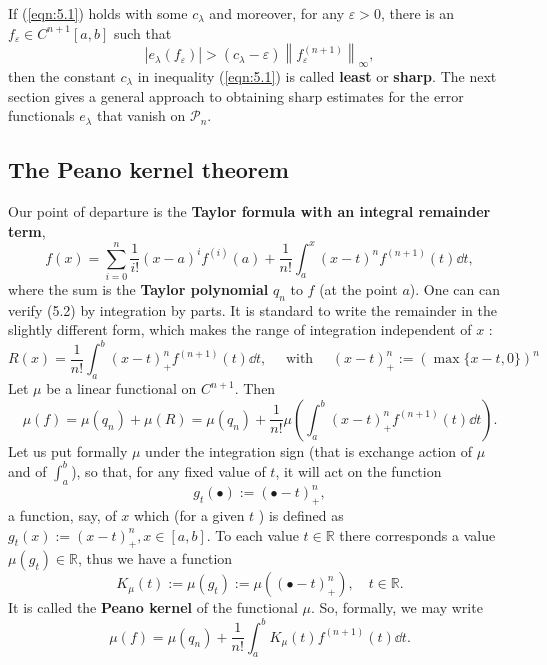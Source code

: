 \documentclass[a4paper]{article}
\renewcommand{\epsilon}{\varepsilon}
\begin{document}
If (\ref{eqn:5.1}) holds with some $c_\lambda$ and moreover, for any $\epsilon>0$, there is an $f_\epsilon \in C^{n+1}[a, b]$ such that
\[
\left|e_\lambda\left(f_\epsilon\right)\right|>\left(c_\lambda-\epsilon\right)\left\|f_\epsilon^{(n+1)}\right\|_{\infty},
\]
then the constant $c_\lambda$ in inequality (\ref{eqn:5.1}) is called \textbf{least} or \textbf{sharp}. The next section gives a general approach to obtaining sharp estimates for the error functionals $e_\lambda$ that vanish on $\mathcal{P}_n$.

\subsection{The Peano kernel theorem}

Our point of departure is the \textbf{Taylor formula with an integral remainder term},
\begin{equation}\label{eqn:5.2}
    f(x)=\sum_{i=0}^n \frac{1}{i !}(x-a)^i f^{(i)}(a)+\frac{1}{n !} \int_a^x(x-t)^n f^{(n+1)}(t)\dd{t},
\end{equation}
where the sum is the \textbf{Taylor polynomial} $q_n$ to $f$ (at the point $a$). One can can verify (5.2) by integration by parts. It is standard to write the remainder in the slightly different form, which makes the range of integration independent of $x$ :
\[
R(x)=\frac{1}{n !} \int_a^b(x-t)_{+}^n f^{(n+1)}(t)\dd{t}, \quad \text { with } \quad(x-t)_{+}^n:=(\max \{x-t, 0\})^n
\]
Let $\mu$ be a linear functional on $C^{n+1}$. Then
\[
\mu(f)=\mu\left(q_n\right)+\mu(R)=\mu\left(q_n\right)+\frac{1}{n !} \mu\left(\int_a^b(x-t)_{+}^n f^{(n+1)}(t)\dd{t}\right) .
\]
Let us put formally $\mu$ under the integration sign (that is exchange action of $\mu$ and of $\int_a^b$), so that, for any fixed value of $t$, it will act on the function
\[
g_t(\bullet):=(\bullet-t)_{+}^n,
\]
a function, say, of $x$ which (for a given $t$ ) is defined as $g_t(x):=(x-t)_{+}^n, x \in[a, b]$. To each value $t \in \mathbb{R}$ there corresponds a value $\mu\left(g_t\right) \in \mathbb{R}$, thus we have a function
\[
K_\mu(t):=\mu\left(g_t\right):=\mu\left((\bullet-t)_{+}^n\right), \quad t \in \mathbb{R} .
\]
It is called the \textbf{Peano kernel} of the functional $\mu$. So, formally, we may write
\begin{equation}\label{eqn:5.3}
    \mu(f)=\mu\left(q_n\right)+\frac{1}{n !} \int_a^b K_\mu(t) f^{(n+1)}(t) \dd{t} .
\end{equation}
\end{document}
